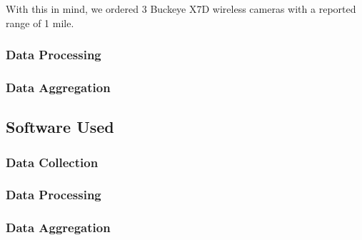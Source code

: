			With this in mind, we ordered 3 Buckeye X7D wireless cameras with a reported range of 1 mile.
		\subsubsection{Data Processing}
		\subsubsection{Data Aggregation}	

	\subsection{Software Used}
		\subsubsection{Data Collection}
		\subsubsection{Data Processing}
		\subsubsection{Data Aggregation}	
	